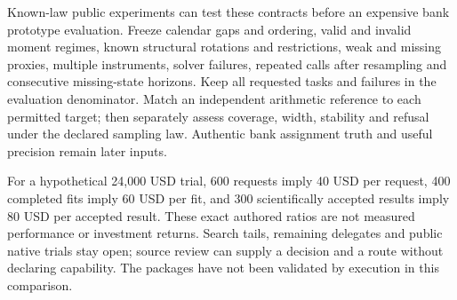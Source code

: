 Known-law public experiments can test these contracts before an expensive bank prototype evaluation. Freeze calendar gaps and ordering, valid and invalid moment regimes, known structural rotations and restrictions, weak and missing proxies, multiple instruments, solver failures, repeated calls after resampling and consecutive missing-state horizons. Keep all requested tasks and failures in the evaluation denominator. Match an independent arithmetic reference to each permitted target; then separately assess coverage, width, stability and refusal under the declared sampling law. Authentic bank assignment truth and useful precision remain later inputs.

For a hypothetical 24,000 USD trial, 600 requests imply 40 USD per request, 400 completed fits imply 60 USD per fit, and 300 scientifically accepted results imply 80 USD per accepted result. These exact authored ratios are not measured performance or investment returns. Search tails, remaining delegates and public native trials stay open; source review can supply a decision and a route without declaring capability. The packages have not been validated by execution in this comparison.\citep{exec25_pydyn_choice}

